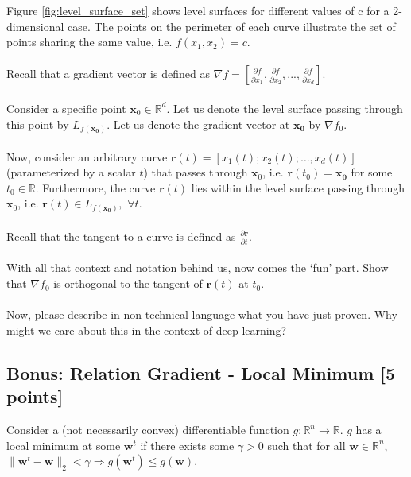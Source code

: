 Figure \ref{fig:level_surface_set} shows level surfaces for different values of c for a 2-dimensional case. The points on the perimeter of each curve illustrate the set of points sharing the same value, i.e. $f(x_1, x_2) = c$.
\\\\
Recall that a gradient vector is defined as $\nabla f = \left[ \frac{\partial f}{\partial x_1}, \frac{\partial f}{\partial x_2}, ..., \frac{\partial f}{\partial x_d} \right]$.
\\\\
Consider a specific point $\mathbf{x}_0 \in \mathbb{R}^d$. Let us denote the level surface passing through this point by $L_{f(\mathbf{x_0})}$. Let us denote the gradient vector at $\mathbf{x_0}$ by $\nabla f_0$. 
\\\\
Now, consider an arbitrary curve $\mathbf{r}(t) = \left[x_1(t); x_2(t); \ldots, x_d(t)\right]$ (parameterized by a scalar $t$) that passes through $\mathbf{x}_0$, i.e. $\mathbf{r}(t_0) = \mathbf{x_0}$ for some $t_0 \in \mathbb{R}$. Furthermore, 
the curve $\mathbf{r}(t)$ lies within the level surface passing through $\mathbf{x}_0$, i.e. $\mathbf{r}(t) \in L_{f(\mathbf{x_0})}, \,\, \forall t$.  
\\\\
Recall that the tangent to a curve is defined as $\frac{\partial \mathbf{r}}{\partial t}$. 
\\\\
With all that context and notation behind us, now comes the `fun' part. Show that $\nabla f_0$ is orthogonal to the tangent of $\mathbf{r}(t)$ at $t_0$. 
\\\\
Now, please describe in non-technical language what you have just proven. Why might we care about this in the context of deep learning?


\taskbreak

\subsection{Bonus: Relation Gradient - Local Minimum [5 points]}
Consider a (not necessarily convex) differentiable function $g : \mathbb{R}^{n} \rightarrow \mathbb{R}$. $g$ has a local minimum at some $\mathbf{w}^{t}$ if there exists some $\gamma > 0$ such that for all $\mathbf{w} \in \mathbb{R}^{n}$, $\lVert\mathbf{w}^{t} - \mathbf{w}\rVert_{2} < \gamma \Rightarrow g(\mathbf{w}^{t}) \leq g(\mathbf{w})$.

